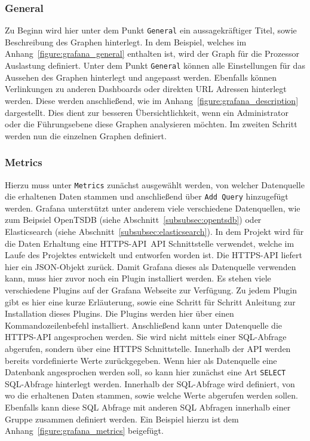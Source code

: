 \subsubsection{General}
Zu Beginn wird hier unter dem Punkt \texttt{General} ein
aussagekräftiger Titel, sowie Beschreibung des Graphen hinterlegt. In dem
Beispiel, welches im Anhang~\ref{figure:grafana_general} enthalten ist, wird
der Graph für die Prozessor Auslastung definiert. Unter dem Punkt
\texttt{General} können alle Einstellungen für das Aussehen des Graphen
hinterlegt und angepasst werden. Ebenfalls können Verlinkungen zu anderen
Dashboards oder direkten URL Adressen hinterlegt werden. Diese werden
anschließend, wie im Anhang~\ref{figure:grafana_description} dargestellt. Dies
dient zur besseren Übersichtlichkeit, wenn ein Administrator oder die
Führungsebene diese Graphen analysieren möchten. Im zweiten Schritt werden nun
die einzelnen Graphen definiert.
\mr%

\subsubsection{Metrics}
Hierzu muss unter \texttt{Metrics} zunächst ausgewählt werden, von welcher
Datenquelle die erhaltenen Daten stammen und anschließend über \texttt{Add
Query} hinzugefügt werden. Grafana unterstützt unter anderem viele verschiedene
Datenquellen, wie zum Beipsiel OpenTSDB (siehe
Abschnitt~\ref{subsubsec:opentsdb}) oder Elasticsearch (siehe
Abschnitt~\ref{subsubsec:elasticsearch}). In dem Projekt wird für die Daten
Erhaltung eine HTTPS\hyp{}API~\gls{API} Schnittstelle verwendet, welche im
Laufe des Projektes entwickelt und entworfen worden ist. Die HTTPS\hyp{}API
liefert hier ein \gls{JSON}\hyp{}Objekt zurück. Damit Grafana dieses als
Datenquelle verwenden kann, muss hier zuvor noch ein Plugin installiert werden.
Es stehen viele verschiedene Plugins auf der Grafana Webseite zur Verfügung. Zu
jedem Plugin gibt es hier eine kurze Erläuterung, sowie eine Schritt für
Schritt Anleitung zur Installation dieses Plugins. Die Plugins werden hier über
einen Kommandozeilenbefehl installiert. Anschließend kann unter Datenquelle die
HTTPS\hyp{}API angesprochen werden. Sie wird nicht mittels einer
SQL\hyp{}Abfrage abgerufen, sondern über eine \gls{HTTPS} Schnittstelle.
Innerhalb der API werden bereits vordefinierte Werte zurückgegeben. Wenn hier
als Datenquelle eine Datenbank angesprochen werden soll, so kann hier zunächst
eine Art \texttt{SELECT} \gls{SQL}\hyp{}Abfrage hinterlegt werden. Innerhalb
der SQL\hyp{}Abfrage wird definiert, von wo die erhaltenen Daten stammen, sowie
welche Werte abgerufen werden sollen. Ebenfalls kann diese SQL Abfrage mit
anderen SQL Abfragen innerhalb einer Gruppe zusammen definiert werden. Ein
Beispiel hierzu ist dem Anhang~\ref{figure:grafana_metrics} beigefügt.

